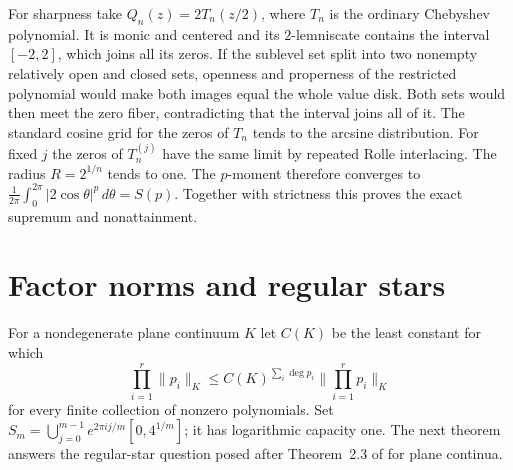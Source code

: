 \documentclass[11pt]{article}
\begin{document}
	For sharpness take $Q_n(z)=2T_n(z/2)$, where $T_n$ is the ordinary
	Chebyshev polynomial. It is monic and centered and its
	$2$-lemniscate contains the interval $[-2,2]$, which joins all its
	zeros. If the sublevel set split into two nonempty relatively
	open and closed sets, openness and properness of the restricted
	polynomial would make both images equal the whole value disk.
	Both sets would then meet the zero fiber, contradicting that the
	interval joins all of it. The standard cosine
	grid for the zeros of $T_n$ tends to the arcsine distribution.
	For fixed $j$ the zeros of $T_n^{(j)}$ have the same limit by repeated
	Rolle interlacing. The radius $R=2^{1/n}$ tends to one. The
	$p$-moment therefore converges to
	$\frac{1}{2\pi}\int_0^{2\pi}|2\cos\theta|^p\,d\theta=S(p)$.
	Together with strictness this proves the exact supremum and
	nonattainment.
	\section{Factor norms and regular stars}\label{sec:stars}
	For a nondegenerate plane continuum $K$ let $C(K)$ be the least
	constant for which
	\[
	\prod_{i=1}^r\|p_i\|_K\leq C(K)^{\sum_i\deg p_i}
	\Big\|\prod_{i=1}^rp_i\Big\|_K
	\]
	for every finite collection of nonzero polynomials.  Set
	$S_m=\bigcup_{j=0}^{m-1}e^{2\pi ij/m}[0,4^{1/m}]$;
	it has logarithmic capacity one.
	The next theorem answers the regular-star question posed after
	Theorem~2.3 of \cite{PR2} for plane continua.
	
\end{document}
